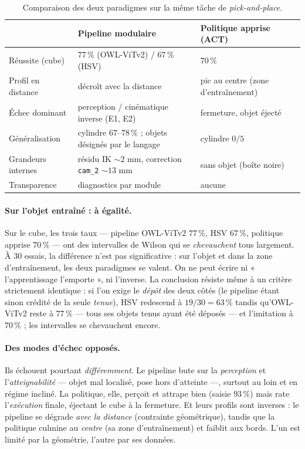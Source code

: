 \begin{table}[H]
  \centering
  \caption{Comparaison des deux paradigmes sur la même tâche de \emph{pick-and-place}.}
  \label{tab:comparaison}
  {\small
  \begin{tabularx}{\linewidth}{lXX}
    \toprule
     & Pipeline modulaire & Politique apprise (ACT) \\
    \midrule
    Réussite (cube)      & $77\,\%$ (OWL-ViTv2) / $67\,\%$ (HSV) & $70\,\%$ \\
    Profil en distance   & décroît avec la distance & pic au centre (zone d'entraînement) \\
    Échec dominant       & perception / cinématique inverse (E1, E2) & fermeture, objet éjecté \\
    Généralisation       & cylindre $67$--$78\,\%$ ; objets désignés par le langage & cylindre $0/5$ \\
    Grandeurs internes   & résidu IK $\sim\!2$ mm, correction \texttt{cam\_2} $\sim\!13$ mm & sans objet (boîte noire) \\
    Transparence         & diagnostics par module & aucune \\
    \bottomrule
  \end{tabularx}}
\end{table}

\paragraph{Sur l'objet entraîné : à égalité.} Sur le cube, les trois taux --- pipeline OWL-ViTv2 $77\,\%$, HSV $67\,\%$, politique apprise $70\,\%$ --- ont des intervalles de Wilson qui se \emph{chevauchent} tous largement. À $30$ essais, la différence n'est pas significative : sur l'objet et dans la zone d'entraînement, les deux paradigmes se valent. On ne peut écrire ni « l'apprentissage l'emporte », ni l'inverse. La conclusion résiste même à un critère strictement identique : si l'on exige le \emph{dépôt} des deux côtés (le pipeline étant sinon crédité de la seule \emph{tenue}), HSV redescend à $19/30 = 63\,\%$ tandis qu'OWL-ViTv2 reste à $77\,\%$ --- tous ses objets tenus ayant été déposés --- et l'imitation à $70\,\%$ ; les intervalles se chevauchent encore.

\paragraph{Des modes d'échec opposés.} Ils échouent pourtant \emph{différemment}. Le pipeline bute sur la \emph{perception} et l'\emph{atteignabilité} --- objet mal localisé, pose hors d'atteinte ---, surtout au loin et en régime incliné. La politique, elle, perçoit et attrape bien (saisie $93\,\%$) mais rate l'\emph{exécution} finale, éjectant le cube à la fermeture. Et leurs profils sont inverses : le pipeline se dégrade \emph{avec la distance} (contrainte géométrique), tandis que la politique culmine au \emph{centre} (sa zone d'entraînement) et faiblit aux bords. L'un est limité par la géométrie, l'autre par ses données.

